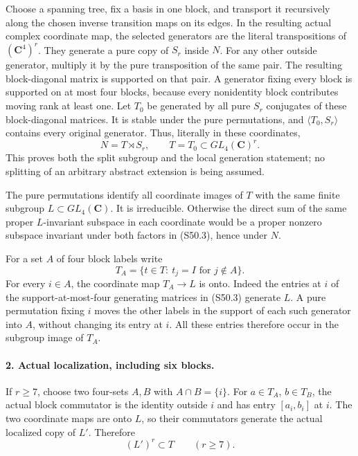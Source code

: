 Choose a spanning tree, fix a basis in one block, and transport
it recursively along the chosen inverse transition maps on
its edges. In the resulting actual complex coordinate map,
the selected generators are the literal transpositions of
\((\mathbf C^4)^r\). They generate a pure copy of \(S_r\)
inside \(N\). For any other outside generator, multiply it
by the pure transposition of the same pair. The resulting
block-diagonal matrix is supported on that pair. A generator
fixing every block is supported on at most four blocks,
because every nonidentity block contributes moving rank at
least one. Let \(T_0\) be generated by all pure \(S_r\)
conjugates of these block-diagonal matrices. It is stable
under the pure permutations, and \(\langle T_0,S_r\rangle\)
contains every original generator. Thus, literally in these
coordinates,
\[
          N=T\rtimes S_r,\qquad T=T_0\subset GL_4(\mathbf C)^r.
                                                               \tag{S50.3}
\]
This proves both the split subgroup and the local generation
statement; no splitting of an arbitrary abstract extension is
being assumed.

The pure permutations identify all coordinate images of \(T\)
with the same finite subgroup \(L\subset GL_4(\mathbf C)\).
It is irreducible. Otherwise the direct sum of the same proper
\(L\)-invariant subspace in each coordinate would be a
proper nonzero subspace invariant under both factors in
(S50.3), hence under \(N\).

For a set \(A\) of four block labels write
\[
 T_A=\{t\in T:\ t_j=I\text{ for }j\notin A\}.
                                                               \tag{S50.4}
\]
For every \(i\in A\), the coordinate map \(T_A\to L\)
is onto. Indeed the entries at \(i\) of the support-at-most-four
generating matrices in (S50.3) generate \(L\). A pure
permutation fixing \(i\) moves the other labels in the
support of each such generator into \(A\), without changing
its entry at \(i\). All these entries therefore occur in
the subgroup image of \(T_A\).

\paragraph{2. Actual localization, including six blocks.}
If \(r\ge7\), choose two four-sets \(A,B\) with
\(A\cap B=\{i\}\). For \(a\in T_A\), \(b\in T_B\),
the actual block commutator is the identity outside \(i\)
and has entry \([a_i,b_i]\) at \(i\). The two coordinate
maps are onto \(L\), so their commutators generate the
actual localized copy of \(L'\). Therefore
\[
                         (L')^r\subset T\qquad(r\ge7).
                                                               \tag{S50.5}
\]

